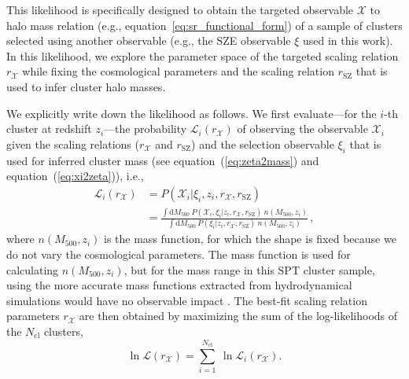 \documentclass[useAMS,usenatbib,iop,numberedappendix]{mn2e}
\newcommand{\Mfiveoo}{\ensuremath{M_{500}}}
\newcommand{\redshift}{\ensuremath{z}}
\begin{document}
This likelihood is specifically designed to obtain the targeted observable $\mathcal{X}$ to halo mass relation (e.g., equation~\ref{eq:sr_functional_form}) of a sample of clusters selected using another observable (e.g., the SZE observable $\xi$ used in this work).  
In this likelihood, we explore the parameter space of the targeted scaling relation $r_{\mathcal{X}}$ while fixing the cosmological parameters and the scaling relation $r_{\mathrm{SZ}}$ that is used to infer cluster halo masses.

We explicitly write down the likelihood as follows.
We first evaluate---for the $i$-th cluster at redshift $\redshift_{i}$---the probability $\mathcal{L}_{i}(r_{\mathcal{X}})$ of observing the observable $\mathcal{X}_{i}$ given the scaling relations ($r_{\mathcal{X}}$  and $r_{\mathrm{SZ}}$) and the selection observable $\xi_{i}$ that is used for inferred cluster mass (see equation~(\ref{eq:zeta2mass}) and equation~(\ref{eq:xi2zeta})), i.e.,
%
\begin{equation}
\label{eq:l15_likelihood1}
\begin{split}
\mathcal{L}_{i}(r_{\mathcal{X}}) &= 
P(\mathcal{X}_{i} | \xi_{i}, z_{i}, r_{\mathcal{X}}, r_{\mathrm{SZ}} )    \\
              &= 
\frac{
\int\mathrm{d}\Mfiveoo\ P(\mathcal{X}_{i}, \xi_{i}| z_{i}, r_{\mathcal{X}}, r_{\mathrm{SZ}} )\ n(\Mfiveoo, z_{i})
}{
\int\mathrm{d}\Mfiveoo\ P( \xi_{i}| z_{i}, r_{\mathcal{X}}, r_{\mathrm{SZ}} ) \ n(\Mfiveoo, z_{i})} \, ,
\end{split}
\end{equation}
%
\noindent where $n(\Mfiveoo, z_{i})$ is the mass function, for which the shape is fixed because we do not vary the cosmological parameters.
The \citet{tinker08} mass function is used for calculating $n(\Mfiveoo, z_{i})$, but for the mass range in this SPT cluster sample, using the more accurate mass functions extracted from hydrodynamical simulations would have no observable impact \citep{bocquet16}.
The best-fit scaling relation parameters $r_{\mathcal{X}}$ are then obtained by maximizing the sum of the log-likelihoods of the $N_\mathrm{cl}$ clusters,
%
\begin{equation}
\label{eq:full_like}
\ln \mathcal{L}(r_{\mathcal{X}}) = \sum_{i=1}^{N_{\mathrm{cl}}}~\ln \mathcal{L}_{i}(r_{\mathcal{X}}).
\end{equation}
%
\end{document}
